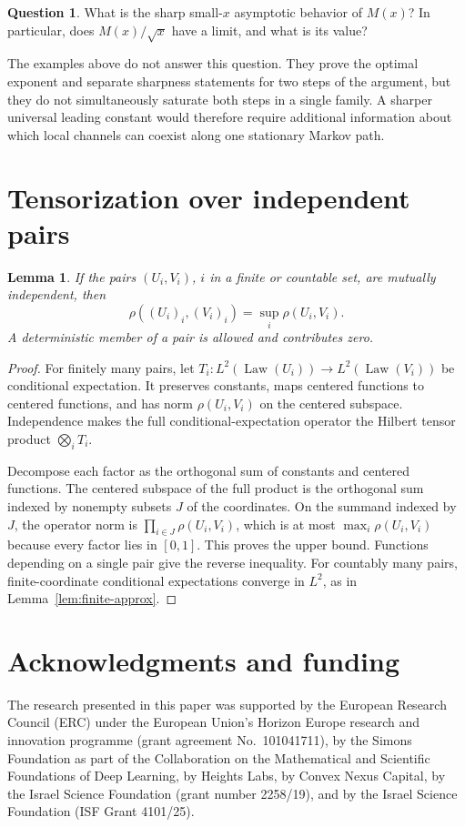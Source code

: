 \documentclass[11pt]{amsart}
\numberwithin{equation}{section}
\newtheorem{lemma}[theorem]{Lemma}
\theoremstyle{definition}
\newtheorem{question}[theorem]{Question}
\newcommand{\Law}{\operatorname{Law}}
\begin{document}
\begin{question}
What is the sharp small-$x$ asymptotic behavior of $M(x)$? In particular, does $M(x)/\sqrt{x}$ have a limit, and what is its value?
\end{question}

The examples above do not answer this question. They prove the optimal exponent and separate sharpness statements for two steps of the argument, but they do not simultaneously saturate both steps in a single family. A sharper universal leading constant would therefore require additional information about which local channels can coexist along one stationary Markov path.

\appendix
\section{Tensorization over independent pairs}\label{app:independent}

\begin{lemma}\label{lem:independent-pairs}
If the pairs $(U_i,V_i)$, $i$ in a finite or countable set, are mutually independent, then
\[
\rho((U_i)_i,(V_i)_i)=\sup_i\rho(U_i,V_i).
\]
A deterministic member of a pair is allowed and contributes zero.
\end{lemma}

\begin{proof}
For finitely many pairs, let $T_i:L^2(\Law(U_i))\to L^2(\Law(V_i))$ be conditional expectation. It preserves constants, maps centered functions to centered functions, and has norm $\rho(U_i,V_i)$ on the centered subspace. Independence makes the full conditional-expectation operator the Hilbert tensor product $\bigotimes_iT_i$.

Decompose each factor as the orthogonal sum of constants and centered functions. The centered subspace of the full product is the orthogonal sum indexed by nonempty subsets $J$ of the coordinates. On the summand indexed by $J$, the operator norm is $\prod_{i\in J}\rho(U_i,V_i)$, which is at most $\max_i\rho(U_i,V_i)$ because every factor lies in $[0,1]$. This proves the upper bound. Functions depending on a single pair give the reverse inequality. For countably many pairs, finite-coordinate conditional expectations converge in $L^2$, as in Lemma~\ref{lem:finite-approx}.
\end{proof}

\section*{Acknowledgments and funding}
The research presented in this paper was supported by the European Research Council (ERC) under the European Union's Horizon Europe research and innovation programme (grant agreement No.~101041711), by the Simons Foundation as part of the Collaboration on the Mathematical and Scientific Foundations of Deep Learning, by Heights Labs, by Convex Nexus Capital, by the Israel Science Foundation (grant number 2258/19), and by the Israel Science Foundation (ISF Grant 4101/25).
\end{document}
